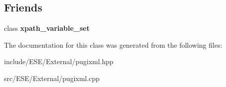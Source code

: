 \subsection*{Friends}
\begin{DoxyCompactItemize}
\item 
\hypertarget{classpugi_1_1xpath__variable_ae065e6f4380a8a530c7352703c09ff80}{class {\bfseries xpath\-\_\-variable\-\_\-set}}\label{classpugi_1_1xpath__variable_ae065e6f4380a8a530c7352703c09ff80}

\end{DoxyCompactItemize}


The documentation for this class was generated from the following files\-:\begin{DoxyCompactItemize}
\item 
include/\-E\-S\-E/\-External/pugixml.\-hpp\item 
src/\-E\-S\-E/\-External/pugixml.\-cpp\end{DoxyCompactItemize}

